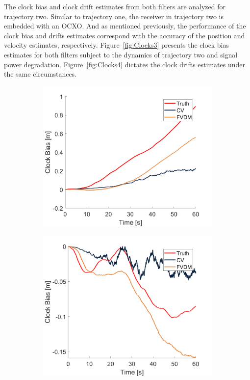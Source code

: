 The clock bias and clock drift estimates from both filters are analyzed for trajectory two. Similar to trajectory one, the receiver in trajectory two is embedded with an OCXO\@. And as mentioned previously, the performance of the clock bias and drifts estimates correspond with the accuracy of the position and velocity estimates, respectively. Figure~\ref{fig:Clocks3} presents the clock bias estimates for both filters subject to the dynamics of trajectory two and signal power degradation. Figure~\ref{fig:Clocks4} dictates the clock drifts estimates under the same circumstances.


\begin{figure}[!ht]
    \begin{subfigure}{.45\textwidth}
        \centering
        \includegraphics[width=1\linewidth]{Figures/dynamic/25/CLOCKBIAS.png}
    \end{subfigure}
    \begin{subfigure}{.45\textwidth}
        \centering
        \includegraphics[width=1\linewidth]{Figures/dynamic/35/CLOCKBIAS.png}

\end{subfigure}
\end{figure}
